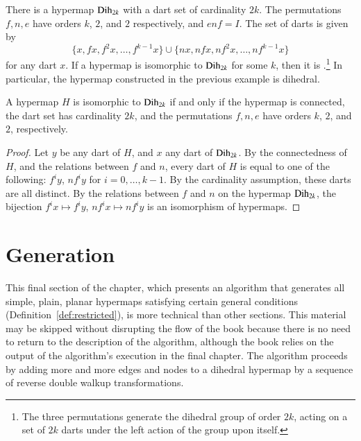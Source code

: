 \begin{example}[dihedral]\label{ex:D2k} 
There is a hypermap ${\operatorname{Dih}}_{2k}$ with a dart set of cardinality $2k$.
The permutations $f,n,e$ have  orders $k$, $2$, and $2$ respectively, and 
$e n f = I$.
The set of darts is given by
\[ 
\{x, f x,f^2 x,\ldots,f^{k-1} x\}\cup \{n x, n f x, n f^2 x,\ldots, n f^{k-1} x\}
\] 
for any dart $x$.
If a hypermap is isomorphic to ${\operatorname{Dih}}_{2k}$ for
some $k$, then it is .\footnote{The three permutations generate the dihedral
group of order $2k$, acting on a set of $2k$ darts under the left action of the group upon itself.}   
In particular,
the hypermap constructed in the previous example is dihedral.
%
\end{example}

\begin{lemma}\cutrate{}\label{lemma:dih-iso}
  A hypermap $H$ is isomorphic to ${\operatorname{Dih}}_{2k}$ if and only if the
  hypermap is connected, the dart set has cardinality $2k$, and the
  permutations $f,n,e$ have orders $k$, $2$, and $2$, respectively.
\end{lemma}

\begin{proof} Let $y$ be any dart of $H$, and $x$ any dart of ${\operatorname{Dih}}_{2k}$.
By the connectedness of $H$, and the relations between $f$ and $n$, every dart of $H$ is
equal to one of the following: $f^i y$, $n f^i y$ for $i=0,\ldots,k-1$.  By the cardinality assumption,
these darts are all distinct.  By the relations between $f$ and $n$ on the hypermap ${\operatorname{Dih}}_{2k}$,
the bijection $f^i x \mapsto f^i y$, $n f^i x \mapsto n f^i y$ is an isomorphism of hypermaps.
\end{proof}


\section{Generation}\label{sec:generation}
%

This final section of the chapter, which presents an algorithm that
generates all simple, plain, planar hypermaps satisfying certain
general conditions (Definition~\ref{def:restricted}), is more
technical than other sections.  This material may be skipped without
disrupting the flow of the book because there is no need to return to
the description of the algorithm, although the book relies on the
output of the algorithm's execution in the final chapter.  The
algorithm proceeds by adding more and more edges and nodes to a
dihedral hypermap by a sequence of reverse double walkup
transformations.

